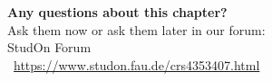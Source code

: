 \begin{frame}[c]
	\begin{center}
		{\bf Any questions about this chapter?}\\[0.5cm]
		Ask them now or ask them later in our forum: \\\bigskip
		StudOn Forum \\
		\faLink\ \url{https://www.studon.fau.de/crs4353407.html} \smallskip

	\end{center}
\end{frame}

